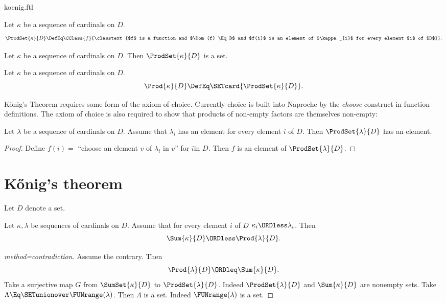 \documentclass{stex}
\begin{document}
\begin{smodule}{koenig.ftl}
\begin{forthel}
  \begin{definition*}[for=ProdSet]
    Let $\kappa$ be a sequence of cardinals on $D$.
    \[ \ProdSet{\kappa}{D} \DefEq \CClass{f}{\classtext{$f$ is a function and $\Dom(f) \Eq D$ and $f(i)$ is an element of $\kappa_{i}$ for every element $i$ of $D$}}. \]
  \end{definition*}

  \begin{axiom*}
    Let $\kappa$ be a sequence of cardinals on $D$.
    Then $\ProdSet{\kappa}{D}$ is a set.
  \end{axiom*}

  \begin{definition*}[for=Prod]
    Let $\kappa$ be a sequence of cardinals on $D$.
    \[ \Prod{\kappa}{D} \DefEq \SETcard{ \ProdSet{\kappa}{D} }. \]
  \end{definition*}
\end{forthel}

Kőnig's Theorem requires some form of the axiom of choice.
Currently choice is built into Naproche by the \emph{choose} construct in
function definitions.
The axiom of choice is also required to show that products of non-empty factors
are themselves non-empty:

\begin{forthel}
  \begin{lemma*}[title=Choice]
    Let $\lambda$ be a sequence of cardinals on $D$.
    Assume that $\lambda_{i}$ has an element for every element $i$ of $D$.
    Then $\ProdSet{\lambda}{D}$ has an element.
  \end{lemma*}
  \begin{proof}
    Define $f(i) =$ ``choose an element $v$ of $\lambda_{i}$ in $v$'' for $i$in $D$.
    Then $f$ is an element of $\ProdSet{\lambda}{D}$.
  \end{proof}
\end{forthel}


\section*{Kőnig's theorem}

\begin{forthel}
  Let $D$ denote a set.

  \begin{theorem*}[title=Kőnig,name=Koenig]
    Let $\kappa, \lambda$ be sequences of cardinals on $D$.
    Assume that for every element $i$ of $D$ $\kappa_{i} \ORDless \lambda_{i}$.
    Then \[ \Sum{\kappa}{D} \ORDless \Prod{\lambda}{D}. \]
  \end{theorem*}
  \begin{proof}[method=contradiction]
    Assume the contrary.
    Then \[ \Prod{\lambda}{D} \ORDleq \Sum{\kappa}{D}. \]
    Take a surjective map $G$ from $\SumSet{\kappa}{D}$ to $\ProdSet{\lambda}{D}$.
    Indeed $\ProdSet{\lambda}{D}$ and $\Sum{\kappa}{D}$ are nonempty sets.
    Take $\Lambda \Eq \SETunionover \FUNrange(\lambda)$.
    Then $\Lambda$ is a set.
    Indeed $\FUNrange(\lambda)$ is a set.


\end{proof}
\end{forthel}
\end{smodule}
\end{document}
